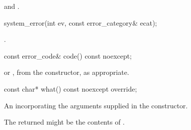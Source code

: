 \begin{itemdescr}
\pnum
{}

\pnum
\ensures \raggedright {} and\linebreak
{}.
\end{itemdescr}

%
\begin{itemdecl}
system_error(int ev, const error_category& ecat);
\end{itemdecl}

\begin{itemdescr}
\pnum
{}

\pnum
\ensures {}.
\end{itemdescr}

%
\begin{itemdecl}
const error_code& code() const noexcept;
\end{itemdecl}

\begin{itemdescr}
\pnum
\returns {} or , from the constructor,
as appropriate.
\end{itemdescr}

%
\begin{itemdecl}
const char* what() const noexcept override;
\end{itemdecl}

\begin{itemdescr}
\pnum
\returns An \ntbs{} incorporating the arguments supplied in the constructor.

\begin{note} The returned \ntbs{} might be the contents of .\end{note}
\end{itemdescr}
